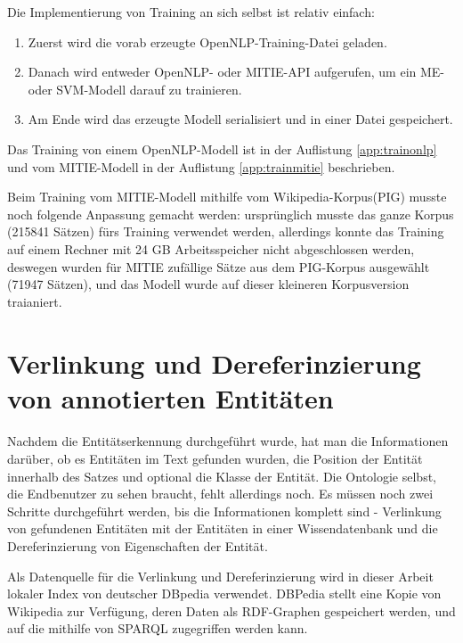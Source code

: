 Die Implementierung von Training an sich selbst ist relativ einfach: 
\begin{enumerate}
\item Zuerst wird die vorab erzeugte OpenNLP-Training-Datei geladen.
\item Danach wird entweder OpenNLP- oder MITIE-API aufgerufen, um ein ME- oder SVM-Modell darauf zu trainieren.
\item Am Ende wird das erzeugte Modell serialisiert und in einer Datei gespeichert.
\end{enumerate}
Das Training von einem OpenNLP-Modell ist in der Auflistung \ref{app:trainonlp} und vom MITIE-Modell in der Auflistung \ref{app:trainmitie} beschrieben.

Beim Training vom MITIE-Modell mithilfe vom Wikipedia-Korpus(PIG) musste noch folgende Anpassung gemacht werden: ursprünglich musste das ganze Korpus (215841 Sätzen) fürs Training verwendet werden, allerdings konnte das Training auf einem Rechner mit 24 GB Arbeitsspeicher nicht abgeschlossen werden, deswegen wurden für MITIE zufällige Sätze aus dem PIG-Korpus ausgewählt (71947 Sätzen), und das Modell wurde auf dieser kleineren Korpusversion traianiert.

\section{Verlinkung und Dereferinzierung von annotierten Entitäten} \label{sec:VERLINKUNGSEC}
\paragraph{}
Nachdem die Entitätserkennung durchgeführt wurde, hat man die Informationen darüber, ob es Entitäten im Text gefunden wurden, die Position der Entität innerhalb des Satzes und optional die Klasse der Entität. Die Ontologie selbst, die Endbenutzer zu sehen braucht, fehlt allerdings noch. Es müssen noch zwei Schritte durchgeführt werden, bis die Informationen komplett sind - Verlinkung von gefundenen Entitäten mit der Entitäten in einer Wissendatenbank und die Dereferinzierung von Eigenschaften der Entität.

Als Datenquelle für die Verlinkung und Dereferinzierung wird in dieser Arbeit lokaler Index von deutscher DBpedia\cite{auer2007dbpedia} verwendet. DBPedia stellt eine Kopie von Wikipedia zur Verfügung, deren Daten als RDF-Graphen gespeichert werden, und auf die mithilfe von SPARQL zugegriffen werden kann.

